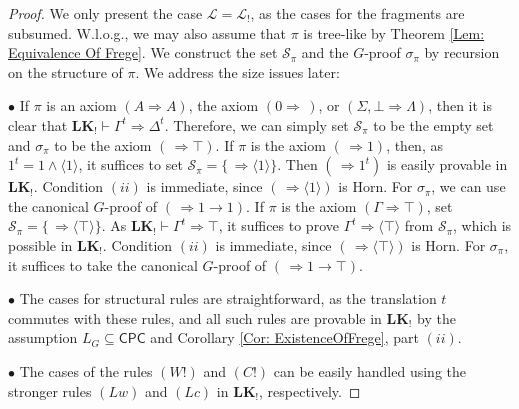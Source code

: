 \documentclass[12pt,a4paper]{article}
\theoremstyle{plain}
\theoremstyle{definition}
\newcommand{\LKajab}{\mathbf{LK_!}}
\begin{document}
\begin{proof}
We only present the case $\mathcal{L}=\mathcal{L}_!$, as the cases for the fragments are subsumed. W.l.o.g., we may also assume that $\pi$ is tree-like by Theorem \ref{Lem: Equivalence Of Frege}. We construct the set $\mathcal{S}_{\pi}$ and the $G$-proof $\sigma_{\pi}$ by recursion on the structure of $\pi$. We address the size issues later:

\vspace{4pt}
\noindent $\bullet$ If $\pi$ is an axiom $(A \Rightarrow A)$, the axiom $(0 \Rightarrow \,)$, or $(\Sigma, \bot \Rightarrow \Lambda)$, then it is clear that $\LKajab \vdash \Gamma^t \Rightarrow \Delta^t$. Therefore, we can simply set $\mathcal{S}_{\pi}$ to be the empty set and $\sigma_{\pi}$ to be the axiom $(\, \Rightarrow \top)$. If $\pi$ is the axiom $(\, \Rightarrow 1)$, then, as $1^t = 1 \wedge \langle 1 \rangle$, it suffices to set $\mathcal{S}_{\pi} = \{\, \Rightarrow \langle 1 \rangle\}$. Then $(\, \Rightarrow 1^t)$ is easily provable in $\LKajab$. Condition $(ii)$ is immediate, since $(\, \Rightarrow \langle 1 \rangle)$ is Horn. For $\sigma_{\pi}$, we can use the canonical $G$-proof of $(\, \Rightarrow 1 \to 1)$.
If $\pi$ is the axiom $(\Gamma \Rightarrow \top)$, set $\mathcal{S}_{\pi} = \{\, \Rightarrow \langle \top \rangle\}$. As $\LKajab \vdash \Gamma^t \Rightarrow \top$, it suffices to prove $\Gamma^t \Rightarrow \langle \top \rangle$ from $\mathcal{S}_{\pi}$, which is possible in $\LKajab$. Condition $(ii)$ is immediate, since $(\, \Rightarrow \langle \top \rangle)$ is Horn. For $\sigma_{\pi}$, it suffices to take the canonical $G$-proof of $(\, \Rightarrow 1 \to \top)$.

\vspace{4pt}
\noindent $\bullet$ The cases for structural rules are straightforward, as the translation $t$ commutes with these rules, and all such rules are provable in $\LKajab$ by the assumption $L_G \subseteq \mathsf{CPC}$ and Corollary \ref{Cor: ExistenceOfFrege}, part $(ii)$.

\vspace{4pt}
\noindent $\bullet$ The cases of the rules $(W!)$ and $(C!)$ can be easily handled using the stronger rules $(Lw)$ and $(Lc)$ in $\LKajab$, respectively.


\end{proof}
\end{document}
